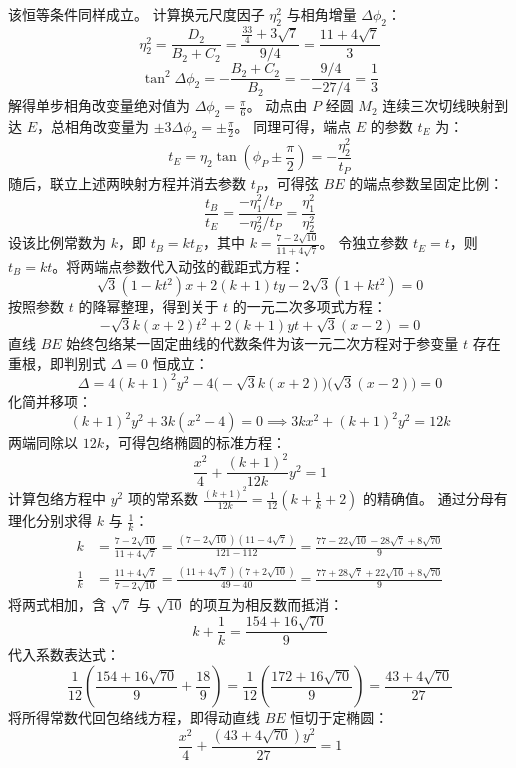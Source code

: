 \begin{solution}
该恒等条件同样成立。
计算换元尺度因子 $\eta_2^2$ 与相角增量 $\Delta\phi_2$：
$$ \eta_2^2 = \frac{D_2}{B_2+C_2} = \frac{\frac{33}{4} + 3\sqrt{7}}{9/4} = \frac{11 + 4\sqrt{7}}{3} $$
$$ \tan^2\Delta\phi_2 = -\frac{B_2+C_2}{B_2} = -\frac{9/4}{-27/4} = \frac{1}{3} $$
解得单步相角改变量绝对值为 $\Delta\phi_2 = \frac{\pi}{6}$。
动点由 $P$ 经圆 $M_2$ 连续三次切线映射到达 $E$，总相角改变量为 $\pm 3\Delta\phi_2 = \pm\frac{\pi}{2}$。
同理可得，端点 $E$ 的参数 $t_E$ 为：
$$ t_E = \eta_2\tan\left(\phi_P \pm \frac{\pi}{2}\right) = -\frac{\eta_2^2}{t_P} $$
随后，联立上述两映射方程并消去参数 $t_P$，可得弦 $BE$ 的端点参数呈固定比例：
$$ \frac{t_B}{t_E} = \frac{-\eta_1^2/t_P}{-\eta_2^2/t_P} = \frac{\eta_1^2}{\eta_2^2} $$
设该比例常数为 $k$，即 $t_B = k t_E$，其中 $k = \frac{7 - 2\sqrt{10}}{11 + 4\sqrt{7}}$。
令独立参数 $t_E = t$，则 $t_B = k t$。将两端点参数代入动弦的截距式方程：
$$ \sqrt{3}(1 - k t^2)x + 2(k + 1)ty - 2\sqrt{3}(1 + k t^2) = 0 $$
按照参数 $t$ 的降幂整理，得到关于 $t$ 的一元二次多项式方程：
$$ -\sqrt{3}k(x+2)t^2 + 2(k+1)yt + \sqrt{3}(x-2) = 0 $$
直线 $BE$ 始终包络某一固定曲线的代数条件为该一元二次方程对于参变量 $t$ 存在重根，即判别式 $\Delta = 0$ 恒成立：
$$ \Delta = 4(k+1)^2 y^2 - 4\big(-\sqrt{3}k(x+2)\big)\big(\sqrt{3}(x-2)\big) = 0 $$
化简并移项：
$$ (k+1)^2 y^2 + 3k(x^2 - 4) = 0 \implies 3k x^2 + (k+1)^2 y^2 = 12k $$
两端同除以 $12k$，可得包络椭圆的标准方程：
$$ \frac{x^2}{4} + \frac{(k+1)^2}{12k} y^2 = 1 $$
计算包络方程中 $y^2$ 项的常系数 $\frac{(k+1)^2}{12k} = \frac{1}{12}\left(k + \frac{1}{k} + 2\right)$ 的精确值。
通过分母有理化分别求得 $k$ 与 $\frac{1}{k}$：
\begin{align*}
k &= \frac{7 - 2\sqrt{10}}{11 + 4\sqrt{7}} = \frac{(7 - 2\sqrt{10})(11 - 4\sqrt{7})}{121 - 112} = \frac{77 - 22\sqrt{10} - 28\sqrt{7} + 8\sqrt{70}}{9} \\
\frac{1}{k} &= \frac{11 + 4\sqrt{7}}{7 - 2\sqrt{10}} = \frac{(11 + 4\sqrt{7})(7 + 2\sqrt{10})}{49 - 40} = \frac{77 + 28\sqrt{7} + 22\sqrt{10} + 8\sqrt{70}}{9}
\end{align*}
将两式相加，含 $\sqrt{7}$ 与 $\sqrt{10}$ 的项互为相反数而抵消：
$$ k + \frac{1}{k} = \frac{154 + 16\sqrt{70}}{9} $$
代入系数表达式：
$$ \frac{1}{12}\left(\frac{154 + 16\sqrt{70}}{9} + \frac{18}{9}\right) = \frac{1}{12} \left(\frac{172 + 16\sqrt{70}}{9}\right) = \frac{43 + 4\sqrt{70}}{27} $$
将所得常数代回包络线方程，即得动直线 $BE$ 恒切于定椭圆：
$$ \frac{x^2}{4} + \frac{(43 + 4\sqrt{70})y^2}{27} = 1 $$

\end{solution}

